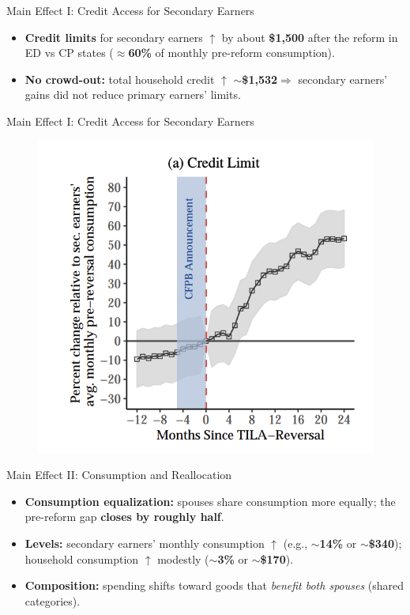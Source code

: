 \documentclass[11pt,notes=hide,aspectratio=169,mathserif]{beamer}
\begin{document}
\begin{frame}{Main Effect I: Credit Access for Secondary Earners}
\small
\begin{itemize}
  \item \textbf{Credit limits} for secondary earners \(\uparrow\) by about \textbf{\$1{,}500} after the reform in ED vs CP states (\(\approx\)\textbf{60\%} of monthly pre-reform consumption).
  \item \textbf{No crowd-out:} total household credit $\uparrow$ \(\sim\)\textbf{\$1{,}532}$\Rightarrow$ secondary earners’ gains did not reduce primary earners’ limits.
\end{itemize}
\end{frame}

\begin{frame}{Main Effect I: Credit Access for Secondary Earners}
\begin{figure}
\centering
\includegraphics[width=0.5\linewidth]{inputs/paper3fig1.png}
\end{figure}
\end{frame}


\begin{frame}{Main Effect II: Consumption and Reallocation}
\small
\begin{itemize}
  \item \textbf{Consumption equalization:} spouses share consumption more equally; the pre-reform gap \textbf{closes by roughly half}.
  \item \textbf{Levels:} secondary earners’ monthly consumption \(\uparrow\) (e.g., \(\sim\)\textbf{14\%} or \(\sim\)\textbf{\$340}); household consumption \(\uparrow\) modestly (\(\sim\)\textbf{3\%} or \(\sim\)\textbf{\$170}).
  \item \textbf{Composition:} spending shifts toward goods that \emph{benefit both spouses} (shared categories).
\end{itemize}
\end{frame}
\end{document}
